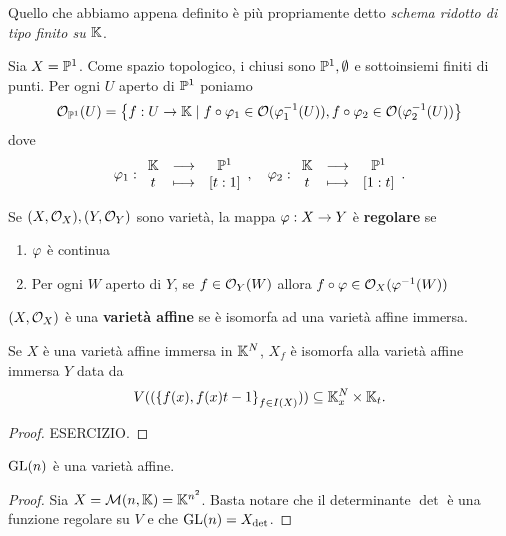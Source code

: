 \begin{remark}
Quello che abbiamo appena definito \`e pi\`u propriamente detto \textit{schema ridotto di tipo finito su $\mathbb{K}$}.
\end{remark}


\begin{example}
Sia $X=\mathbb{P}^1$. Come spazio topologico, i chiusi sono $\mathbb{P}^1,\emptyset$ e sottoinsiemi finiti di punti. Per ogni $U$ aperto di $\mathbb{P}^1$ poniamo
\[\mathcal{O}_{\mathbb{P}^1}(U)=\left\{ f:U\to \mathbb{K}\mid f\circ \varphi_1\in\mathcal{O}(\varphi_1^{-1}(U)),f\circ \varphi_2\in\mathcal{O}(\varphi_2^{-1}(U))\right\}\]
dove
\[\varphi_1:\begin{array}{ccc} {\mathbb{K}} & \longrightarrow & {\mathbb{P}^1}\\ {t} & \longmapsto & {[t:1]} \end{array},\quad \varphi_2:\begin{array}{ccc} {\mathbb{K}} & \longrightarrow & {\mathbb{P}^1}\\ {t} & \longmapsto & {[1:t]} \end{array}.\]
\end{example}

\begin{definition}
Se $(X,\mathcal{O}_X),(Y,\mathcal{O}_Y)$ sono variet\`a, la mappa $\varphi:X\to Y$ \`e \textbf{regolare} se
\begin{enumerate}
	\item $\varphi$ \`e continua
	\item Per ogni $W$ aperto di $Y$, se $f\in\mathcal{O}_Y(W)$ allora $f\circ \varphi\in \mathcal{O}_X(\varphi^{-1}(W))$
\end{enumerate}
\end{definition}

\begin{definition}
$(X,\mathcal{O}_X)$ \`e una \textbf{variet\`a affine} se \`e isomorfa ad una variet\`a affine immersa.
\end{definition}


\begin{proposition}
Se $X$ \`e una variet\`a affine immersa in $\mathbb{K}^N$, $X_f$ \`e isomorfa alla variet\`a affine immersa $Y$ data da 
\[V((\left\{ f(x),f(x)t-1\right\}_{f\in I(X)}))\subseteq \mathbb{K}^N_x\times \mathbb{K}_t.\]
\end{proposition}
\begin{proof}
ESERCIZIO.
\end{proof}
\begin{corollary}[]
$\operatorname{GL}(n)$ \`e una variet\`a affine.
\end{corollary}
\begin{proof}
Sia $X=\mathcal{M}(n,\mathbb{K})= \mathbb{K}^{n^2}$. Basta notare che il determinante $\det$ \`e una funzione regolare su $V$ e che $\operatorname{GL}(n)=X_{\det}$.
\end{proof}


